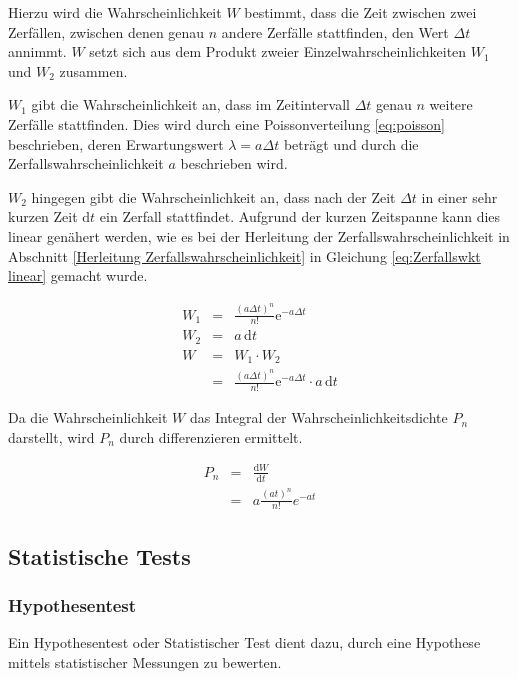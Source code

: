 \documentclass[12pt,a4paper]{scrartcl}
\numberwithin{equation}{section} %
\begin{document}
Hierzu wird die Wahrscheinlichkeit $W$ bestimmt, dass die Zeit zwischen zwei Zerfällen, zwischen denen genau $n$ andere Zerfälle stattfinden, den Wert $\Delta t$ annimmt. $W$ setzt sich aus dem Produkt zweier Einzelwahrscheinlichkeiten $W_1$ und $W_2$ zusammen.

$W_1$ gibt die Wahrscheinlichkeit an, dass im Zeitintervall $\Delta t$ genau $n$ weitere Zerfälle stattfinden. Dies wird durch eine Poissonverteilung \eqref{eq:poisson} beschrieben, deren Erwartungswert $\lambda = a\Delta t$ beträgt und durch die Zerfallswahrscheinlichkeit $a$ beschrieben wird.

$W_2$ hingegen gibt die Wahrscheinlichkeit an, dass nach der Zeit $\Delta t$ in einer sehr kurzen Zeit $\mathrm dt$ ein Zerfall stattfindet. Aufgrund der kurzen Zeitspanne kann dies linear genähert werden, wie es bei der Herleitung der Zerfallswahrscheinlichkeit in Abschnitt \ref{Herleitung Zerfallswahrscheinlichkeit}  in Gleichung \eqref{eq:Zerfallswkt linear} gemacht wurde.

\begin{eqnarray}
	W_1 &=& \frac{(a\Delta t)^n}{n!} \mathrm{e}^{-a\Delta t} \\
	W_2 &=& a \,\mathrm dt \\
	W &=& W_1 \cdot W_2 \\
	&=& \frac{\left(a\Delta t\right)^n}{n!}  \mathrm{e}^{-a\Delta t} \cdot a \,\mathrm dt
\end{eqnarray}

\noindent
Da die Wahrscheinlichkeit $W$ das Integral der Wahrscheinlichkeitsdichte $P_n$ darstellt, wird $P_n$ durch differenzieren ermittelt.

\begin{eqnarray}
	P_n &=& \frac{\mathrm dW}{\mathrm dt} \\
	&=& a \frac{\left(at\right)^n}{n!} e^{-at}
\end{eqnarray}

\hypertarget{statistische-tests}{%
\subsection{Statistische Tests}\label{statistische-tests}}

\hypertarget{hypothesentest}{%
\subsubsection{Hypothesentest}\label{hypothesentest}}

Ein Hypothesentest oder Statistischer Test dient dazu, durch eine Hypothese mittels statistischer Messungen zu bewerten.
\end{document}
